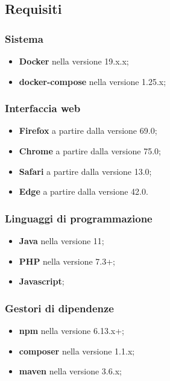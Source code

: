 \subsection{Requisiti}
	\subsubsection{Sistema}
	\begin{itemize}
		\item \textbf{Docker} nella versione 19.x.x;
		\item \textbf{docker-compose} nella versione 1.25.x;
	\end{itemize}
	\subsubsection{Interfaccia web}
		\begin{itemize}
		 	\item \textbf{Firefox} a partire dalla versione 69.0;
		 	\item \textbf{Chrome} a partire dalla versione 75.0;
		 	\item \textbf{Safari} a partire dalla versione 13.0;
		 	\item \textbf{Edge} a partire dalla versione 42.0.
		\end{itemize} 
	\subsubsection{Linguaggi di programmazione}
		\begin{itemize}
			\item \textbf{Java} nella versione 11;
			\item \textbf{PHP} nella versione 7.3+;
			\item \textbf{Javascript};
		\end{itemize}
	\subsubsection{Gestori di dipendenze}
		\begin{itemize}
			\item \textbf{npm} nella versione 6.13.x+;
			\item \textbf{composer} nella versione 1.1.x;
			\item \textbf{maven} nella versione 3.6.x; 
		\end{itemize}
